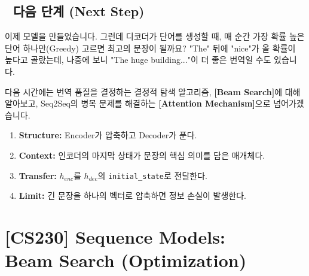 \documentclass[11pt,a4paper]{book}
\theoremstyle{definition}
\begin{document}
\section*{🔗 다음 단계 (Next Step)}
이제 모델을 만들었습니다. 그런데 디코더가 단어를 생성할 때, 매 순간 가장 확률 높은 단어 하나만(Greedy) 고르면 최고의 문장이 될까요?
"The" 뒤에 "nice"가 올 확률이 높다고 골랐는데, 나중에 보니 "The huge building..."이 더 좋은 번역일 수도 있습니다.

다음 시간에는 번역 품질을 결정하는 결정적 탐색 알고리즘, \textbf{[Beam Search]}에 대해 알아보고, Seq2Seq의 병목 문제를 해결하는 \textbf{[Attention Mechanism]}으로 넘어가겠습니다.

\vspace{0.5cm}

\begin{summarybox}[title={단원 요약 (Cheat Sheet)}]
\begin{enumerate}
    \item \textbf{Structure:} Encoder가 압축하고 Decoder가 푼다.
    \item \textbf{Context:} 인코더의 마지막 상태가 문장의 핵심 의미를 담은 매개체다.
    \item \textbf{Transfer:} $h_{enc}$를 $h_{dec}$의 \texttt{initial\_state}로 전달한다.
    \item \textbf{Limit:} 긴 문장을 하나의 벡터로 압축하면 정보 손실이 발생한다.
\end{enumerate}
\end{summarybox}


\chapter{[CS230] Sequence Models: \\ Beam Search (Optimization)}
\label{ch:lecture47}

\end{document}
